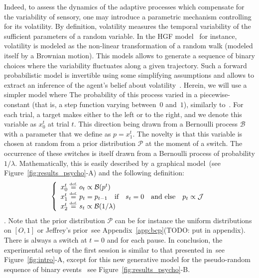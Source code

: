 \documentclass[profile,final,english, draft]{article}%
\newcommand{\choice}[1]{ %
	\left\{ %
		\begin{array}{l} #1 \end{array} %
	\right. }
\newcommand{\eqdef}{\ensuremath{\stackrel{\mbox{\upshape\tiny def.}}{=}}}
\newcommand{\eql}[1]{\begin{equation}#1\end{equation}}
\newcommand{\Bb}{\mathcal{B}}
\newcommand{\Jj}{\mathcal{J}}
\newcommand{\Pp}{\mathcal{P}}
\newcommand{\citep}[1]{\parencite{#1}}
\newcommand{\citet}[1]{\textcite{#1}}
\newcommand{\seeFig}[1]{see Figure~\ref{fig:#1}}
\newcommand{\seeApp}[1]{see Appendix~\ref{app:#1}}
\begin{document}
Indeed, to assess the dynamics of the adaptive processes
which compensate for the variability of sensory,
one may introduce a parametric mechanism controlling for its volatility.
By definition, volatility measures the temporal variability
of the sufficient parameters of a random variable.
In the HGF model~\citep{Matthys2011} for instance,
volatility is modeled as the non-linear transformation
of a random walk (modeled itself by a Brownian motion).
This models allows to generate a sequence of binary choices
where the variability fluctuates along a given trajectory.
Such a forward probabilistic model is invertible
using some simplifying assumptions and allows
to extract an inference of the agent's belief about volatility~\citep{Voessel??}.
Herein, we will use a simpler model where
The probability of this process varied in a piecewise-constant
(that is, a step function varying between~$0$ and~$1$),
similarly to~\citet{Meyniel13}.
For each trial, a target makes either to the left or to the right,
and we denote this variable as $x_0^t$ at trial $t$.
This direction being drawn from a Bernoulli process $\Bb$
with a parameter that we define as $p=x_1^t$.
The novelty is that this variable is chosen
at random from a prior distribution $\Pp$ at the moment of a switch.
The occurrence of these switches is itself drawn from a Bernoulli process
of probability $1/\lambda$.
Mathematically, this is easily described
by a graphical model~(\seeFig{results_psycho}-A) and
the following definition:
\eql{\choice{
x_0^t \eqdef o_t \propto \Bb(p^t) \\
x_1^t \eqdef p_t = p_{t-1} \quad \text{if} \quad s_t=0 \quad \text{and else} \quad p_t \propto \Jj \\
x_2^t \eqdef s_t \propto \Bb(1/\lambda)
}\label{eq:sgm}}.
Note that the prior distribution $\Pp$ can be for instance
the uniform distributions on $ [ O, 1 ] $ or
Jeffrey's prior~\seeApp{bcp}(TODO: put in appendix).
There is always a switch at $t=0$ and for each pause.
In conclusion, the experimental setup of the first session
is similar to that presented in~\seeFig{intro}-A, except for
this new generative model for the pseudo-random sequence of binary events
~\seeFig{results_psycho}-B.
\end{document}
